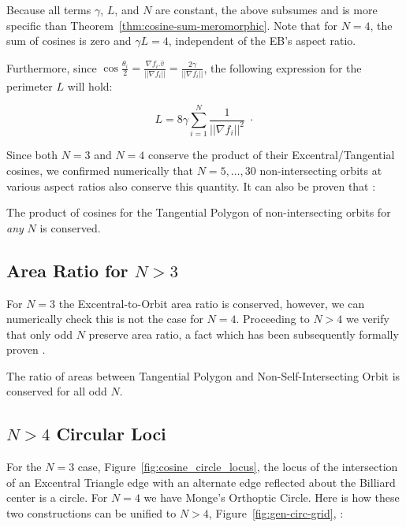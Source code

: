 \noindent Because all terms $\gamma$, $L$, and $N$ are constant, the above subsumes and is more specific than Theorem~\ref{thm:cosine-sum-meromorphic}. Note that for $N=4$, the sum of cosines is zero and $\gamma{L}=4$, independent of the EB's aspect ratio.

Furthermore, since $\cos\frac{\theta_i}{2}=\frac{\nabla{f_i}.\hat{v}}{||\nabla{f_i}||}=\frac{2\gamma}{||\nabla{f_i}||}$, the following expression for the perimeter $L$ will hold:

\begin{corollary}
\begin{equation}
    L=8\gamma\sum_{i=1}^{N}\frac{1 }{||\nabla{f_i}||^2} \;\cdot
    \label{eqn:perimeter-new}
\end{equation}
\end{corollary}

\noindent Since both $N=3$ and $N=4$ conserve the product of their Excentral/Tangential cosines, we confirmed numerically that $N=5,\ldots,30$ non-intersecting orbits at various aspect ratios also conserve this quantity. It can also be proven that \cite{akopyan19_private_meromorphic}:

\begin{theorem}
The product of cosines for the Tangential Polygon of non-intersecting orbits for {\em any} $N$ is conserved.
\end{theorem}

\subsection{Area Ratio for $N>3$}

For $N=3$ the Excentral-to-Orbit area ratio is conserved, however, we can numerically check this is not the case for $N=4$. Proceeding to $N>4$ we verify that only odd $N$ preserve area ratio, a fact which has been subsequently formally proven \cite{akopyan19_private_meromorphic}.

\begin{theorem}
The ratio of areas between Tangential Polygon and Non-Self-Intersecting Orbit is conserved for all odd $N$.
\end{theorem}

\subsection{$N>4$ Circular Loci}

For the $N=3$ case,  Figure~\ref{fig:cosine_circle_locus}, the locus of the intersection of an Excentral Triangle edge with an alternate edge reflected about the Billiard center is a circle. For $N=4$ we have Monge's Orthoptic Circle. Here is how these two constructions can be unified to $N>4$, Figure~\ref{fig:gen-circ-grid}, \cite[pl\#5]{dsr_math_intell_playlist}:

